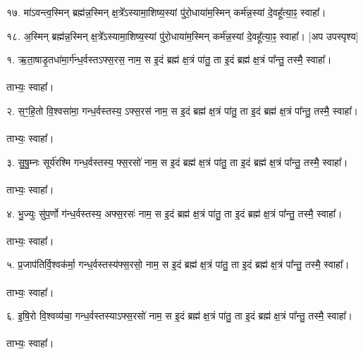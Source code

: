 १७.  मा॑ऽवन्त्व॒स्मिन् ब्रह्म॑न्न॒स्मिन् क्ष॒त्रे᳚ऽस्यामा॒शिष्य॒स्यां पु॑रो॒धाया॑म॒स्मिन् कर्म॑न्न॒स्यां दे॒वहू᳚त्या॒ꣴ॒ स्वाहा᳚।

१८.  अ॒स्मिन् ब्रह्म॑न्न॒स्मिन् क्ष॒त्रे᳚ऽस्यामा॒शिष्य॒स्यां पु॑रो॒धाया॑म॒स्मिन् कर्म॑न्न॒स्यां दे॒वहू᳚त्या॒ꣴ॒ स्वाहा᳚।
[अप उपस्पृश्य]
\endgroup

\begingroup
\setlength{\ULdepth}{1ex}

१. ऋ॒ता॒षाडृ॒तधा॑मा॒र्ग॑न्ध॒र्वस्तऽफ्स॒रस॒  नाम॒
स इ॒दं ब्रह्म॑ क्ष॒त्रं पा॑तु॒ ता इ॒दं ब्रह्म॑ क्ष॒त्रं पा᳚न्तु॒ तस्मै॒ स्वाहा᳚।\\
\\
ताभ्यः॒ स्वाहा᳚।

२. स॒ꣳ॒हि॒तो वि॒श्वसा॑मा॒  गन्ध॒र्वस्तस्य॒ ऽफ्स॒रस॑  नाम॒
स इ॒दं ब्रह्म॑ क्ष॒त्रं पा॑तु॒ ता इ॒दं ब्रह्म॑ क्ष॒त्रं पा᳚न्तु॒ तस्मै॒ स्वाहा᳚।\\
\\
ताभ्यः॒ स्वाहा᳚।

३. सु॒षु॒म्नः सूर्य॑रश्मि गन्ध॒र्वस्तस्य॒ फ्स॒रसो॑  नाम॒
स इ॒दं ब्रह्म॑ क्ष॒त्रं पा॑तु॒ ता इ॒दं ब्रह्म॑ क्ष॒त्रं पा᳚न्तु॒ तस्मै॒ स्वाहा᳚।\\
\\
ताभ्यः॒ स्वाहा᳚।

४. भु॒ज्युः सु॑प॒र्णो  ग॑न्ध॒र्वस्तस्य॒  अफ्स॒रसः॑  नाम॒
स इ॒दं ब्रह्म॑ क्ष॒त्रं पा॑तु॒ ता इ॒दं ब्रह्म॑ क्ष॒त्रं पा᳚न्तु॒ तस्मै॒ स्वाहा᳚।\\
\\
ताभ्यः॒ स्वाहा᳚।

५. प्र॒जाप॑तिर्वि॒श्वक॑र्मा॒  गन्ध॒र्वस्तस्य॑फ्स॒रसो॒  नाम॒
स इ॒दं ब्रह्म॑ क्ष॒त्रं पा॑तु॒ ता इ॒दं ब्रह्म॑ क्ष॒त्रं पा᳚न्तु॒ तस्मै॒ स्वाहा᳚।\\
\\
ताभ्यः॒ स्वाहा᳚।

६. इ॒षि॒रो वि॒श्वव्य॑चा॒  गन्ध॒र्वस्तस्याऽफ्स॒रसो॑  नाम॒
स इ॒दं ब्रह्म॑ क्ष॒त्रं पा॑तु॒ ता इ॒दं ब्रह्म॑ क्ष॒त्रं पा᳚न्तु॒ तस्मै॒ स्वाहा᳚।\\
\\
ताभ्यः॒ स्वाहा᳚।

